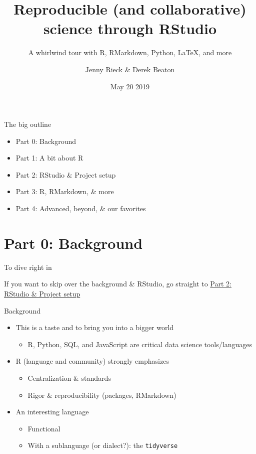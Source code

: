 \documentclass[
  ignorenonframetext,
]{beamer}
\title{Reproducible (and collaborative) science through RStudio}
\subtitle{A whirlwind tour with R, RMarkdown, Python, LaTeX, and more}
\author{Jenny Rieck \& Derek Beaton}
\date{May 20 2019}
\providecommand{\tightlist}{%
  \setlength{\itemsep}{0pt}\setlength{\parskip}{0pt}}
\begin{document}
\frame{\titlepage}

\begin{frame}{The big outline}
\protect\hypertarget{the-big-outline}{}

\begin{itemize}
\tightlist
\item
  Part 0: Background
\item
  Part 1: A bit about R
\item
  Part 2: RStudio \& Project setup
\item
  Part 3: R, RMarkdown, \& more
\item
  Part 4: Advanced, beyond, \& our favorites
\end{itemize}

\end{frame}

\hypertarget{part-0-background}{%
\section{Part 0: Background}\label{part-0-background}}

\begin{frame}{To dive right in}
\protect\hypertarget{to-dive-right-in}{}

If you want to skip over the background \& RStudio, go straight to
\protect\hyperlink{part-2-rstudio-project-setup}{Part 2: RStudio \&
Project setup}

\end{frame}

\begin{frame}[fragile]{Background}
\protect\hypertarget{background}{}

\begin{itemize}
\tightlist
\item
  This is a taste and to bring you into a bigger world

  \begin{itemize}
  \tightlist
  \item
    R, Python, SQL, and JavaScript are critical data science
    tools/languages
  \end{itemize}
\item
  R (language and community) strongly emphasizes

  \begin{itemize}
  \tightlist
  \item
    Centralization \& standards
  \item
    Rigor \& reproducibility (packages, RMarkdown)
  \end{itemize}
\item
  An interesting language

  \begin{itemize}
  \tightlist
  \item
    Functional
  \item
    With a sublanguage (or dialect?): the \texttt{tidyverse}
  \end{itemize}
\end{itemize}

\end{frame}
\end{document}
